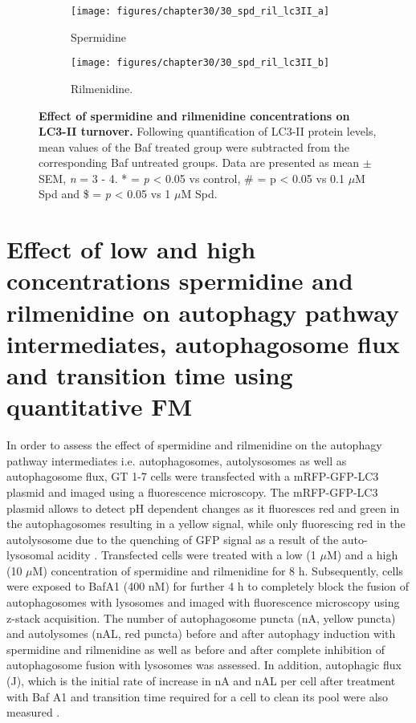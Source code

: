 \begin{figure}[!htbp]
  \centering
  \begin{subfigure}[b]{0.495\linewidth}
    \texttt{[image: figures/chapter30/30\_spd\_ril\_lc3II\_a]}
    \caption{Spermidine}
  \end{subfigure}
  \begin{subfigure}[b]{0.495\linewidth}
    \texttt{[image: figures/chapter30/30\_spd\_ril\_lc3II\_b]}
    \caption{Rilmenidine.}
  \end{subfigure}
  \caption[Effect of spermidine and rilmenidine concentrations on LC3-II turnover]{\textbf{Effect of spermidine and rilmenidine concentrations on LC3-II turnover.} Following quantification of LC3-II protein levels, mean values of the Baf treated group were subtracted from the corresponding Baf untreated groups. Data are presented as mean $\pm$ SEM, \textit{n} = 3 - 4. * = \textit{p} < 0.05 vs control, \# = p < 0.05 vs 0.1 $\mu$M Spd and \$ = \textit{p} < 0.05 vs 1 $\mu$M Spd.}
  \label{fig:30_spd_ril_lc3ii}
\end{figure}

\section{Effect of low and high concentrations spermidine and rilmenidine on autophagy pathway intermediates, autophagosome flux and transition time using quantitative FM}
In order to assess the effect of spermidine and rilmenidine on the autophagy pathway intermediates i.e. autophagosomes, autolysosomes as well as autophagosome flux, GT 1-7 cells were transfected with a mRFP-GFP-LC3 plasmid \citep{yoshii2017} and imaged using a fluorescence microscopy. The mRFP-GFP-LC3 plasmid allows to detect pH dependent changes as it fluoresces red and green in the autophagosomes resulting in a yellow signal, while only fluorescing red in the autolysosome due to the quenching of GFP signal as a result of the auto-lysosomal acidity \citep{yoshii2017}. Transfected cells were treated with a low (1 $\mu$M) and a high (10 $\mu$M) concentration of spermidine and rilmenidine for 8 h. Subsequently, cells were exposed to BafA1 (400 nM) for further 4 h to completely block the fusion of autophagosomes with lysosomes \citep{DuToit2018b} and imaged with fluorescence microscopy using z-stack acquisition. The number of autophagosome puncta (nA, yellow puncta) and autolysomes (nAL, red puncta) before and after autophagy induction with spermidine and rilmenidine as well as before and after complete inhibition of autophagosome fusion with lysosomes was assessed. In addition, autophagic flux (J), which is the initial rate of increase in nA and nAL per cell after treatment with Baf A1 and transition time required for a cell to clean its pool were also measured \citep{DuToit2018a,DuToit2018b,loos2014}.


